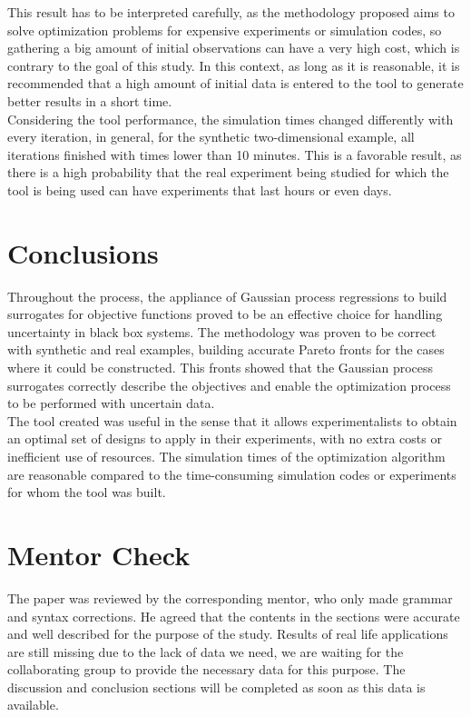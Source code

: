 \documentclass{article}
\begin{document}
This result has to be interpreted carefully, as the methodology proposed aims to solve optimization problems for expensive experiments or simulation codes, so gathering a big amount of initial observations can have a very high cost, which is contrary to the goal of this study. In this context, as long as it is reasonable, it is recommended that a high amount of initial data is entered to the tool to generate better results in a short time.\\

Considering the tool performance, the simulation times changed differently with every iteration, in general, for the synthetic two-dimensional example, all iterations finished with times lower than 10 minutes. This is a favorable result, as there is a high probability that the real experiment being studied for which the tool is being used can have experiments that last hours or even days.

\section{Conclusions}

Throughout the process, the appliance of Gaussian process regressions to build surrogates for objective functions proved to be an effective choice for handling uncertainty in black box systems. The methodology was proven to be correct with synthetic and real examples, building accurate Pareto fronts for the cases where it could be constructed. This fronts showed that the Gaussian process surrogates correctly describe the objectives and enable the optimization process to be performed with uncertain data.\\

The tool created was useful in the sense that it allows experimentalists to obtain an optimal set of designs to apply in their experiments, with no extra costs or inefficient use of resources. The simulation times of the optimization algorithm are reasonable compared to the time-consuming simulation codes or experiments for whom the tool was built.





\section{Mentor Check}

The paper was reviewed by the corresponding mentor, who only made grammar and syntax corrections. He agreed that the contents in the sections were accurate and well described for the purpose of the study. Results of real life applications are still missing due to the lack of data we need, we are waiting for the collaborating group to provide the necessary data for this purpose. The discussion and conclusion sections will be completed as soon as this data is available.
\end{document}

